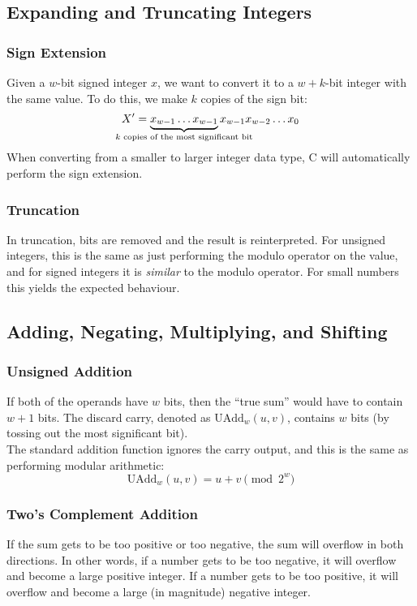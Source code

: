 \documentclass[class=article, crop=false]{standalone}
\begin{document}
  \subsection{Expanding and Truncating Integers}
  \subsubsection{Sign Extension}
  Given a $w$-bit signed integer $x$, we want to convert it to a $w+k$-bit integer with the same value. To do this, we make $k$ copies of the sign bit:
  \[
    X' = \underbrace{x_{w-1}\ldots x_{w-1}}_{\mathclap{\text{$k$ copies of the most significant bit}}}x_{w-1}x_{w-2}\ldots x_0
  \]
  When converting from a smaller to larger integer data type, C will automatically perform the sign extension.
  \subsubsection{Truncation}
  In truncation, bits are removed and the result is reinterpreted. For unsigned integers, this is the same as just performing the modulo operator on the value, and for signed integers it is \emph{similar} to the modulo operator. For small numbers this yields the expected behaviour.
  \subsection{Adding, Negating, Multiplying, and Shifting}
  \subsubsection{Unsigned Addition}
  If both of the operands have $w$ bits, then the ``true sum'' would have to contain $w+1$ bits. The discard carry, denoted as $\mathrm{UAdd}_w(u, v)$, contains $w$ bits (by tossing out the most significant bit). \\[10pt]
  The standard addition function ignores the carry output, and this is the same as performing modular arithmetic:
  \[
    \mathrm{UAdd}_w(u, v) = u + v \pmod{2^w}
  \]
  \subsubsection{Two's Complement Addition}
  If the sum gets to be too positive or too negative, the sum will overflow in both directions. In other words, if a number gets to be too negative, it will overflow and become a large positive integer. If a number gets to be too positive, it will overflow and become a large (in magnitude) negative integer.
\end{document}
